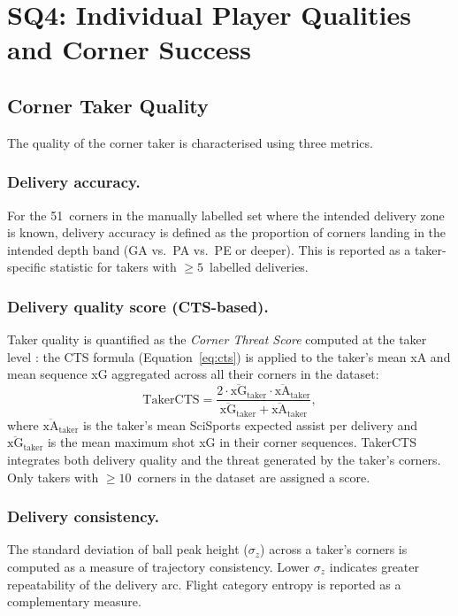 \section{SQ4: Individual Player Qualities and Corner Success}
\label{sec:sq4}

\subsection{Corner Taker Quality}
\label{sec:sq4_taker}

The quality of the corner taker is characterised using three metrics.

\subsubsection{Delivery accuracy.}
For the 51~corners in the manually labelled set where the intended delivery zone
is known, delivery accuracy is defined as the proportion of corners landing in
the intended depth band (GA vs.\ PA vs.\ PE or deeper). This is reported as a
taker-specific statistic for takers with $\geq 5$~labelled deliveries.

\subsubsection{Delivery quality score (CTS-based).}
Taker quality is quantified as the \textit{Corner Threat Score} computed at the
taker level \citep{Lamberts2023}: the CTS formula (Equation~\ref{eq:cts}) is
applied to the taker's mean xA and mean sequence xG aggregated across all their
corners in the dataset:
\begin{equation}
  \mathrm{TakerCTS} = \frac{2 \cdot \overline{\mathrm{xG}}_{\mathrm{taker}}
                              \cdot \overline{\mathrm{xA}}_{\mathrm{taker}}}
                           {\overline{\mathrm{xG}}_{\mathrm{taker}}
                              + \overline{\mathrm{xA}}_{\mathrm{taker}}},
  \label{eq:taker_cts}
\end{equation}
where $\overline{\mathrm{xA}}_{\mathrm{taker}}$ is the taker's mean SciSports
expected assist per delivery and $\overline{\mathrm{xG}}_{\mathrm{taker}}$ is
the mean maximum shot xG in their corner sequences. TakerCTS integrates both
delivery quality and the threat generated by the taker's corners.
Only takers with $\geq 10$~corners in the dataset are assigned a score.

\subsubsection{Delivery consistency.}
The standard deviation of ball peak height ($\sigma_{z}$) across a taker's corners
is computed as a measure of trajectory consistency. Lower $\sigma_{z}$ indicates
greater repeatability of the delivery arc. Flight category entropy is reported
as a complementary measure.

